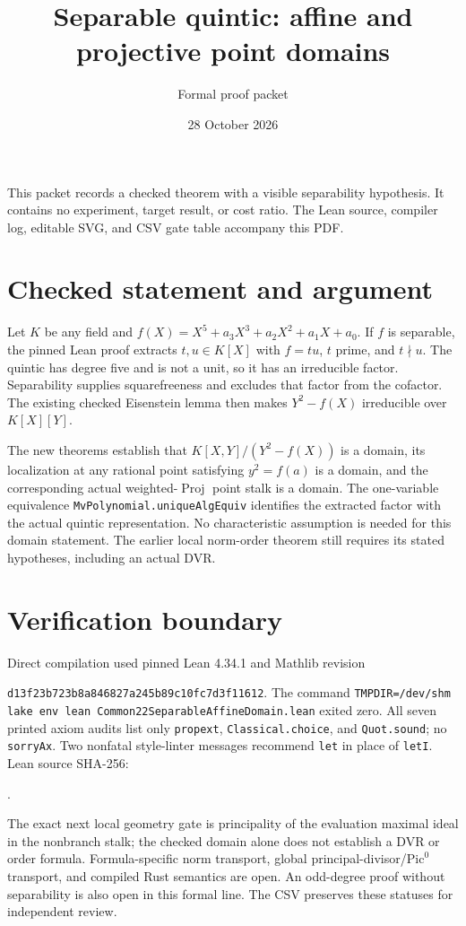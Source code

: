 \documentclass[11pt]{article}
\title{Separable quintic: affine and projective point domains}
\author{Formal proof packet}
\date{28 October 2026}
\begin{document}
\maketitle
\noindent This packet records a checked theorem with a visible separability hypothesis. It contains no experiment, target result, or cost ratio. The Lean source, compiler log, editable SVG, and CSV gate table accompany this PDF.

\section*{Checked statement and argument}
Let $K$ be any field and $f(X)=X^5+a_3X^3+a_2X^2+a_1X+a_0$. If $f$ is separable, the pinned Lean proof extracts $t,u\in K[X]$ with $f=tu$, $t$ prime, and $t\nmid u$. The quintic has degree five and is not a unit, so it has an irreducible factor. Separability supplies squarefreeness and excludes that factor from the cofactor. The existing checked Eisenstein lemma then makes $Y^2-f(X)$ irreducible over $K[X][Y]$.

The new theorems establish that $K[X,Y]/(Y^2-f(X))$ is a domain, its localization at any rational point satisfying $y^2=f(a)$ is a domain, and the corresponding actual weighted-$\operatorname{Proj}$ point stalk is a domain. The one-variable equivalence \texttt{MvPolynomial.uniqueAlgEquiv} identifies the extracted factor with the actual quintic representation. No characteristic assumption is needed for this domain statement. The earlier local norm-order theorem still requires its stated hypotheses, including an actual DVR.

\section*{Verification boundary}
Direct compilation used pinned Lean 4.34.1 and Mathlib revision
\par\noindent\texttt{d13f23b723b8a846827a245b89c10fc7d3f11612}.
The command \texttt{TMPDIR=/dev/shm lake env lean Common22SeparableAffineDomain.lean} exited zero. All seven printed axiom audits list only \texttt{propext}, \texttt{Classical.choice}, and \texttt{Quot.sound}; no \texttt{sorryAx}. Two nonfatal style-linter messages recommend \texttt{let} in place of \texttt{letI}. Lean source SHA-256:
\par{}.

The exact next local geometry gate is principality of the evaluation maximal ideal in the nonbranch stalk; the checked domain alone does not establish a DVR or order formula. Formula-specific norm transport, global principal-divisor/$\mathrm{Pic}^0$ transport, and compiled Rust semantics are open. An odd-degree proof without separability is also open in this formal line. The CSV preserves these statuses for independent review.
\end{document}
